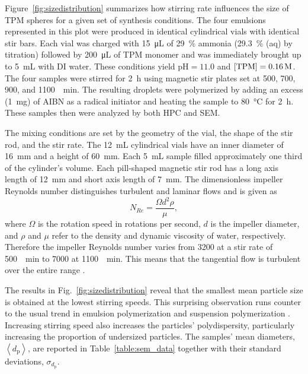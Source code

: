 \documentclass[journal=langd5,manuscript=article,layout=twocolumn]{achemso}
\newcommand{\avg}[1]{\left< #1 \right>}
\begin{document}
Figure~\ref{fig:sizedistribution} summarizes how
stirring rate influences the size
of TPM spheres for a given set of synthesis conditions.
The four emulsions represented in this plot
were produced in identical cylindrical 
vials with identical stir bars. 
Each vial was charged with
\SI{15}{\micro\liter} of \SI{29}{\percent} ammonia 
(\SI{29.3}{\percent} (aq) by  titration) followed by
\SI{200}{\micro\liter} of TPM monomer and was immediately
brought up to \SI{5}{\milli\liter} with DI water.
These conditions yield $\text{pH} = \num{11.0}$ and
$[\ce{TPM}] = \SI{0.16}{M}$.
The four samples were stirred for \SI{2}{\hour}
using magnetic stir plates set at \num{500}, \num{700}, \num{900}, and
\SI{1100}{\per\minute}. 
The resulting droplets were polymerized by adding an excess (\SI{1}{mg}) of AIBN
as a radical initiator and
heating the sample to \SI{80}{\celsius} for \SI{2}{\hour}.
These samples then were analyzed by both HPC and SEM.

The mixing conditions are set by the geometry of the vial, the shape
of the stir rod, and the stir rate. The \SI{12}{\milli\liter}
cylindrical vials 
have an inner diameter of \SI{16}{\milli\meter} and a height of \SI{60}{\milli\meter}.
Each \SI{5}{\milli\liter} sample filled approximately one third of the cylinder's volume.
Each pill-shaped magnetic stir rod has a long axis length of \SI{12}{\milli\meter} 
and short axis length of \SI{7}{\milli\meter}. The dimensionless impeller Reynolds number
distinguishes turbulent and laminar flows and is given as
\begin{equation}
    N_{Re} = \frac{\Omega d^2 \rho}{\mu},
\end{equation}
where $\Omega$ is the rotation speed in rotations per second, 
$d$ is the impeller diameter, and $\rho$ and $\mu$ refer to the
density and dynamic viscosity of water, respectively.
Therefore the impeller Reynolds number varies from
\num{3200} at a stir rate of \SI{500}{\per\minute}
to \num{7000} at \SI{1100}{\per\minute}.
This means that the tangential flow is turbulent over the entire 
range \cite{halasz2007vortex}.

The results in Fig.~\ref{fig:sizedistribution}
reveal that the smallest mean particle size is
obtained at the lowest stirring speeds.
This surprising observation
runs counter to the usual trend \cite{oles1992shear,eggersdorfer2010fragmentation}
in emulsion polymerization
\cite{chern06}
and suspension polymerization
\cite{arshady92}.
Increasing stirring speed also increases the particles'
polydispersity, particularly increasing the proportion of undersized particles.
The samples' mean diameters, $\avg{d_{\text{p}}}$,
are reported in Table~\ref{table:sem_data} together
with their standard deviations, $\sigma_{d_{\text{p}}}$.
\end{document}
